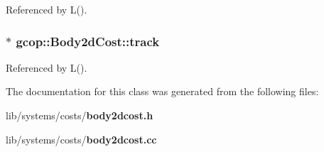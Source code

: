 \-Referenced by \-L().

\subsubsection[{track}]{$\ast$ {\bf gcop\-::\-Body2d\-Cost\-::track}}\label{classgcop_1_1Body2dCost_a439eddeacc2f7e7c59293f43ac6ca8cc}


\-Referenced by \-L().



\-The documentation for this class was generated from the following files\-:\begin{DoxyCompactItemize}
\item 
lib/systems/costs/{\bf body2dcost.\-h}\item 
lib/systems/costs/{\bf body2dcost.\-cc}\end{DoxyCompactItemize}
